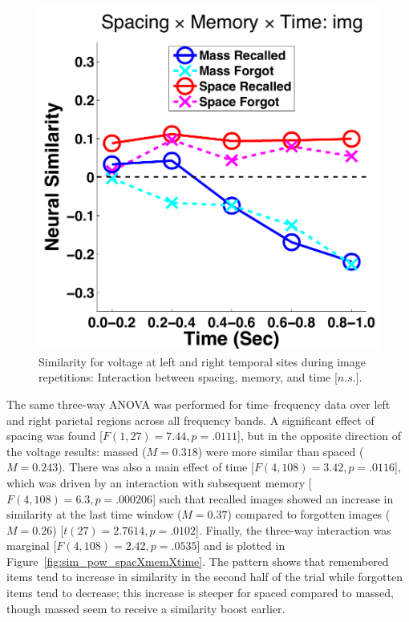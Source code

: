 

\begin{figure}
  \centering
  \includegraphics[width=.40\textwidth]{./figs/exp1/similarity_spacXmemXtime_img_tla_LTRT_0to200_200to400_400to600_600to800_800to1000_kaiser_cosine}
  \caption{Similarity for voltage at left and right temporal sites during image repetitions: Interaction between spacing, memory, and time [$n.s.$].}
  \label{fig:sim_tla_spacXmemXtime}
\end{figure}


The same three-way ANOVA was performed for time--frequency data over left and right parietal regions across all frequency bands.  A significant effect of spacing was found [$F(1,27)=7.44, p=.0111$], but in the opposite direction of the voltage results: massed ($M=0.318$) were more similar than spaced ($M=0.243$).  There was also a main effect of time [$F(4,108)=3.42, p=.0116$], which was driven by an interaction with subsequent memory [$F(4,108)=6.3, p=.000206$] such that recalled images showed an increase in similarity at the last time window ($M=0.37$) compared to forgotten images ($M=0.26$) [$t(27)=2.7614, p=.0102$].
Finally, the three-way interaction was marginal [$F(4,108)=2.42, p=.0535$] and is plotted in Figure~\ref{fig:sim_pow_spacXmemXtime}.  The pattern shows that remembered items tend to increase in similarity in the second half of the trial while forgotten items tend to decrease; this increase is steeper for spaced compared to massed, though massed seem to receive a similarity boost earlier.

